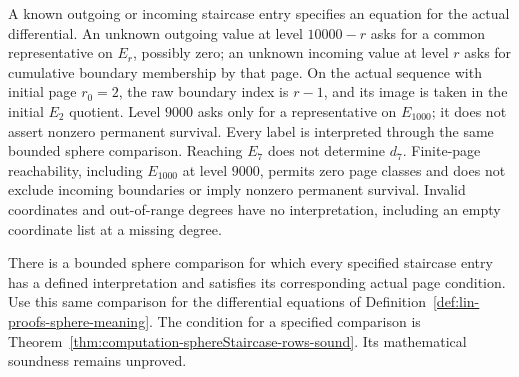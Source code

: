 \begin{definition}
  \label{def:lin-staircase-states}
  \notready
  A known outgoing or incoming staircase entry specifies an equation
  for the actual differential. An unknown outgoing value at level
  $10000-r$ asks for a common representative on $E_r$, possibly zero;
  an unknown incoming value at level $r$ asks for cumulative boundary
  membership by that page. On the actual sequence with initial page
  $r_0=2$, the raw boundary index is $r-1$, and its image is taken in
  the initial $E_2$ quotient. Level $9000$ asks only for a representative
  on $E_{1000}$; it does not assert nonzero permanent survival.
  Every label is interpreted through the same bounded sphere
  comparison. Reaching $E_7$ does not determine $d_7$. Finite-page
  reachability, including $E_{1000}$ at level $9000$, permits zero page
  classes and does not exclude incoming boundaries or imply nonzero
  permanent survival. Invalid coordinates and out-of-range degrees have no
  interpretation, including an empty coordinate list at a missing degree.
\end{definition}

\begin{theorem}
  \label{thm:lin-staircase-delivery}
  \notready
  There is a bounded sphere comparison for which every specified
  staircase entry has a defined interpretation and
  satisfies its corresponding actual page condition. Use this same
  comparison for the differential equations of
  Definition~\ref{def:lin-proofs-sphere-meaning}.
  The condition for a specified comparison is
  Theorem~\ref{thm:computation-sphereStaircase-rows-sound}.
  Its mathematical soundness remains unproved.
\end{theorem}

